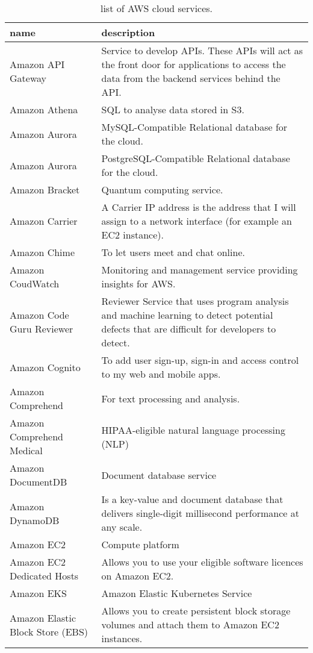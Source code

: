 \documentclass[]{book}
\begin{document}
\begin{table}

\caption{\label{tab:unnamed-chunk-7}list of AWS cloud services.}
\centering
\begin{tabular}[t]{ll}
\toprule
name & description\\
\midrule
Amazon API Gateway & Service to develop APIs. These APIs will act as the front door for applications to access the data from the backend services behind the API.\\
Amazon Athena & SQL to analyse data stored in S3.\\
Amazon Aurora & MySQL-Compatible    Relational database for the cloud.\\
Amazon Aurora & PostgreSQL-Compatible   Relational database for the cloud.\\
Amazon Bracket & Quantum computing service.\\
\addlinespace
Amazon Carrier & A Carrier IP address is the address that I will assign to a network interface (for example an EC2 instance).\\
Amazon Chime & To let users meet and chat online.\\
Amazon CoudWatch & Monitoring and management service providing insights for AWS.\\
Amazon Code Guru Reviewer & Reviewer    Service that uses program analysis and machine learning to detect potential defects that are difficult for developers to detect.\\
Amazon Cognito & To add user sign-up, sign-in and access control to my web and mobile apps.\\
\addlinespace
Amazon Comprehend & For text processing and analysis.\\
Amazon Comprehend Medical & HIPAA-eligible natural language processing (NLP)\\
Amazon DocumentDB & Document database service\\
Amazon DynamoDB & Is a key-value and document database that delivers single-digit millisecond performance at any scale.\\
Amazon EC2 & Compute platform\\
\addlinespace
Amazon EC2 Dedicated Hosts & Allows you to use your eligible software licences on Amazon EC2.\\
Amazon EKS & Amazon Elastic Kubernetes Service\\
Amazon Elastic Block Store (EBS) & Allows you to create persistent block storage volumes and attach them to Amazon EC2 instances.\\

\end{tabular}
\end{table}
\end{document}
